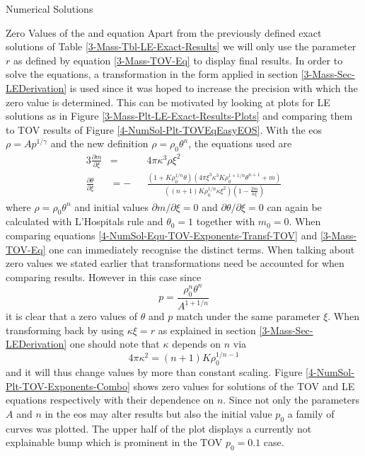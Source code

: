 \begin{section}{Numerical Solutions}
\begin{subsection}{Zero Values of the  and  equation}
Apart from the previously defined exact solutions of Table \ref{3-Mass-Tbl-LE-Exact-Results} we will only use the parameter $r$ as defined by equation \eqref{3-Mass-TOV-Eq} to display final results.
In order to solve the equations, a transformation in the form applied in section \ref{3-Mass-Sec-LEDerivation} is used since it was hoped to increase the precision with which the zero value is determined.
This can be motivated by looking at plots for \ac{LE} solutions as in Figure \ref{3-Mass-Plt-LE-Exact-Results-Plots} and comparing them to \ac{TOV} results of Figure \ref{4-NumSol-Plt-TOVEqEasyEOS}.
With the \ac{eos} $\rho=Ap^{1/\gamma}$ and the new definition $\rho=\rho_0\theta^n$, the equations used are 
\begin{alignat}{3}
	\frac{\partial m}{\partial\xi} &= &&4\pi\kappa^3\rho\xi^2\\
	\frac{\partial\theta}{\partial\xi} &= -&&\frac{\left(1+K\rho_0^{1/n}\theta\right)\left(4\pi\xi^3\kappa^3K\rho_0^{1+1/n}\theta^{n+1}+ m\right)}{\left((n+1)K\rho_0^{1/n}\kappa\xi^2\right)\left(1-\frac{2 m}{\kappa\xi}\right)}
	\label{4-NumSol-Equ-TOV-Exponents-Transf-TOV}
\end{alignat}
where $\rho=\rho_0\theta^n$ and initial values $\partial m/\partial\xi=0$ and $\partial\theta/\partial\xi=0$ can again be calculated with L'Hospitals rule and $\theta_0=1$ together with $ m_0=0$.
When comparing equations \eqref{4-NumSol-Equ-TOV-Exponents-Transf-TOV} and \eqref{3-Mass-TOV-Eq} one can immediately recognise the distinct terms.
When talking about zero values we stated earlier that transformations need be accounted for when comparing results.
However in this case since
\begin{equation}
	p=\frac{\rho_0^n\theta^n}{A^{1+1/n}}
\end{equation}
it is clear that a zero values of $\theta$ and $p$ match under the same parameter $\xi$.
When transforming back by using $\kappa\xi=r$ as explained in section \ref{3-Mass-Sec-LEDerivation} one should note that $\kappa$ depends on $n$ via 
\begin{equation}
	4\pi\kappa^2=(n+1)K\rho_0^{1/n-1}
\end{equation}
and it will thus change values by more than constant scaling.
Figure \ref{4-NumSol-Plt-TOV-Exponents-Combo} shows zero values for solutions of the \ac{TOV} and \ac{LE} equations respectively with their dependence on $n$.
Since not only the parameters $A$ and $n$ in the \ac{eos} may alter results but also the initial value $p_0$ a family of curves was plotted.
The upper half of the plot displays a currently not explainable bump which is prominent in the \ac{TOV} $p_0=0.1$ case.

\end{subsection}
\end{section}
